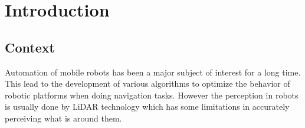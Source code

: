 \chapter{Introduction} \label{ch:introduction}









\section{Context}
Automation of mobile robots has been a major subject of interest for a long time. This lead to the development of various algorithms to optimize the behavior of robotic platforms when doing navigation tasks. However the perception in robots is usually done by \ac{LiDAR} technology which has some limitations in accurately perceiving what is around them.

